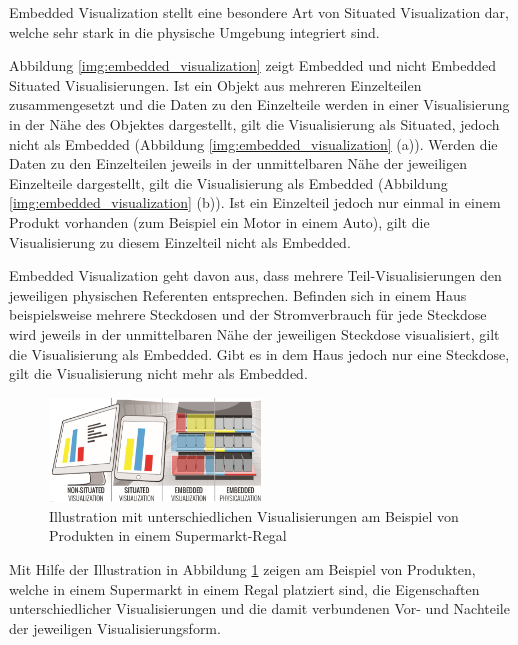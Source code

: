 \cite[S.~195]{Marriott2018} Embedded Visualization stellt eine besondere Art von Situated Visualization dar, welche sehr stark in die physische Umgebung integriert sind. 

Abbildung \ref{img:embedded_visualization} zeigt Embedded und nicht Embedded Situated Visualisierungen. \cite[S.~202]{Marriott2018} Ist ein Objekt aus mehreren Einzelteilen 
zusammengesetzt und die Daten zu den Einzelteile werden in einer Visualisierung in der Nähe des Objektes dargestellt, gilt die Visualisierung als Situated, jedoch nicht als Embedded (Abbildung \ref{img:embedded_visualization} (a)).
Werden die Daten zu den Einzelteilen jeweils in der unmittelbaren Nähe der jeweiligen Einzelteile dargestellt, gilt die Visualisierung als Embedded (Abbildung \ref{img:embedded_visualization} (b)). Ist ein Einzelteil jedoch nur einmal in einem Produkt vorhanden (zum Beispiel ein Motor in einem Auto), gilt die Visualisierung zu diesem Einzelteil nicht als Embedded. 

Embedded Visualization geht davon aus, dass mehrere Teil-Visualisierungen den jeweiligen physischen Referenten entsprechen. Befinden sich in einem Haus beispielsweise mehrere Steckdosen und der Stromverbrauch 
für jede Steckdose wird jeweils in der unmittelbaren Nähe der jeweiligen Steckdose visualisiert, gilt die Visualisierung als Embedded. Gibt es in dem Haus jedoch nur eine Steckdose, gilt die Visualisierung nicht mehr als
Embedded.

\vspace{15mm} 
\begin{figure}[H]
	\centering
	\includegraphics[width=0.5\textwidth]{resources/fundamentals/situated_visualization/Illustration_situated_embedded_visualization.png}
	\caption{Illustration mit unterschiedlichen Visualisierungen am Beispiel von Produkten in einem Supermarkt-Regal}
	\label{img:Illustration_situated_embedded_visualization}
\end{figure}

Mit Hilfe der Illustration in Abbildung \ref{img:Illustration_situated_embedded_visualization} zeigen \citeauthor{Willett2017} am Beispiel von Produkten, 
welche in einem Supermarkt in einem Regal platziert sind, die Eigenschaften unterschiedlicher Visualisierungen und die damit verbundenen Vor- und Nachteile der jeweiligen Visualisierungsform. 

